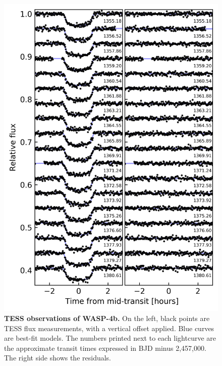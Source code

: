 \documentclass[12pt,twocolumn,tighten]{aastex62}
\begin{document}
\begin{figure}[t]
    \begin{center}
		\includegraphics[height=0.97\textheight]{f1.png}
    \end{center}
    \vspace{-0.8cm}
    \caption{
      {\bf TESS observations of WASP-4b.} On the left, black points
      are TESS flux measurements, with a vertical offset applied. Blue
      curves are best-fit models. The numbers printed next to each
      lightcurve are the approximate transit times expressed in BJD
      minus 2{,}457{,}000.  The right side shows the residuals.
       \label{fig:lightcurves}
    }
\end{figure}
\end{document}
